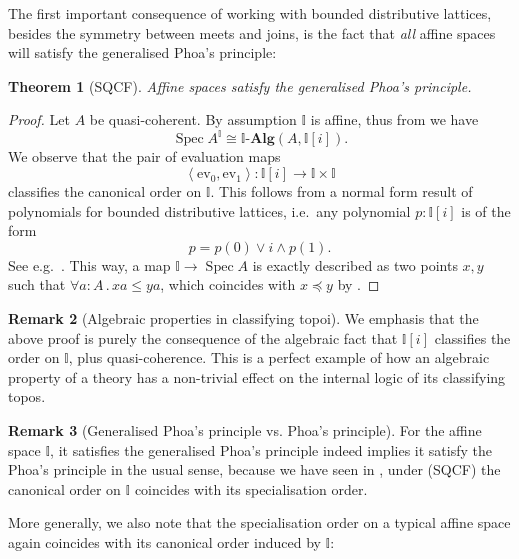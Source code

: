 \documentclass[12pt]{amsart}
\newtheorem{theorem}{Theorem}[section]
\theoremstyle{definition}
\newtheorem{remark}[theorem]{Remark}
\newcommand{\mb}[1]{\mathbf{#1}}
\newcommand{\mbb}[1]{\mathbb{#1}}
\newcommand{\I}{\mbb I}
\newcommand{\alg}{\text{-}\mb{Alg}}
\newcommand{\pair}[1]{\left\langle#1\right\rangle}
\newcommand{\ev}{\mathrm{ev}}
\newcommand{\fa}[2]{\forall #1\!\colon\!\!#2\mathpunct{.}}
\newcommand{\spec}{\operatorname{Spec}}
\begin{document}
The first important consequence of working with bounded distributive lattices, besides the symmetry between meets and joins, is the fact that \emph{all} affine spaces will satisfy the generalised Phoa's principle:

\begin{theorem}[SQCF]\label{thm:phoaaffine}
  Affine spaces satisfy the generalised Phoa's principle.
\end{theorem}
\begin{proof}
  Let $A$ be quasi-coherent. By assumption $\I$ is affine, thus from  we have
  \[ \spec A^\I \cong \I\alg(A,\I[i]). \]
  We observe that the pair of evaluation maps
  \[ \pair{\ev_0,\ev_1} : \I[i] \to \I \times \I \]
  classifies the canonical order on $\I$. This follows from a normal form result of polynomials for bounded distributive lattices, i.e.\ any polynomial $p:\I[i]$ is of the form 
  \[ p = p(0) \vee i \wedge p(1). \]
  See e.g.~\cite[Thm. 10.11]{lausch2000algebra}. This way, a map $\I \to \spec A$ is exactly described as two points $x,y$ such that $\fa aA xa \le ya$, which coincides with $x \preceq y$ by .
\end{proof}

\begin{remark}[Algebraic properties in classifying topoi]\label{rem:normalalgebra}
  We emphasis that the above proof is purely the consequence of the algebraic fact that $\I[i]$ classifies the order on $\I$, plus quasi-coherence. This is a perfect example of how an algebraic property of a theory has a non-trivial effect on the internal logic of its classifying topos.
\end{remark}

\begin{remark}[Generalised Phoa's principle vs. Phoa's principle]
  For the affine space $\I$, it satisfies the generalised Phoa's principle indeed implies it satisfy the Phoa's principle in the usual sense, because we have seen in , under (SQCF) the canonical order on $\I$ coincides with its specialisation order. 
\end{remark}

More generally, we also note that the specialisation order on a typical affine space again coincides with its canonical order induced by $\I$:
\end{document}
